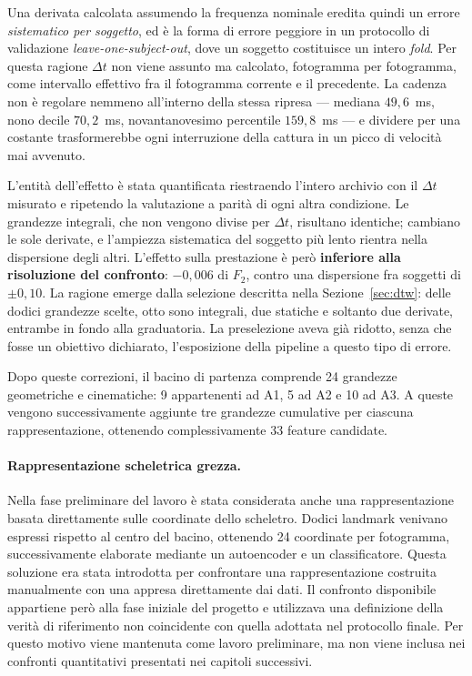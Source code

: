 Una derivata calcolata assumendo la frequenza nominale eredita quindi un errore \emph{sistematico per soggetto}, ed è la forma di errore peggiore in un protocollo di validazione \emph{leave-one-subject-out}, dove un soggetto costituisce un intero \emph{fold}. Per questa ragione $\Delta t$ non viene assunto ma calcolato, fotogramma per fotogramma, come intervallo effettivo fra il fotogramma corrente e il precedente. La cadenza non è regolare nemmeno all'interno della stessa ripresa --- mediana $49{,}6$~ms, nono decile $70{,}2$~ms, novantanovesimo percentile $159{,}8$~ms --- e dividere per una costante trasformerebbe ogni interruzione della cattura in un picco di velocità mai avvenuto.

L'entità dell'effetto è stata quantificata riestraendo l'intero archivio con il $\Delta t$ misurato e ripetendo la valutazione a parità di ogni altra condizione. Le grandezze integrali, che non vengono divise per $\Delta t$, risultano identiche; cambiano le sole derivate, e l'ampiezza sistematica del soggetto più lento rientra nella dispersione degli altri. L'effetto sulla prestazione è però \textbf{inferiore alla risoluzione del confronto}: $-0{,}006$ di $F_2$, contro una dispersione fra soggetti di $\pm 0{,}10$. La ragione emerge dalla selezione descritta nella Sezione~\ref{sec:dtw}: delle dodici grandezze scelte, otto sono integrali, due statiche e soltanto due derivate, entrambe in fondo alla graduatoria. La preselezione aveva già ridotto, senza che fosse un obiettivo dichiarato, l'esposizione della pipeline a questo tipo di errore.

Dopo queste correzioni, il bacino di partenza comprende 24 grandezze geometriche e cinematiche: 9 appartenenti ad A1, 5 ad A2 e 10 ad A3. A queste vengono successivamente aggiunte tre grandezze cumulative per ciascuna rappresentazione, ottenendo complessivamente 33 feature candidate.

\paragraph{Rappresentazione scheletrica grezza.}

Nella fase preliminare del lavoro è stata considerata anche una rappresentazione basata direttamente sulle coordinate dello scheletro. Dodici landmark venivano espressi rispetto al centro del bacino, ottenendo 24 coordinate per fotogramma, successivamente elaborate mediante un autoencoder e un classificatore.
Questa soluzione era stata introdotta per confrontare una rappresentazione costruita manualmente con una appresa direttamente dai dati. Il confronto disponibile appartiene però alla fase iniziale del progetto e utilizzava una definizione della verità di riferimento non coincidente con quella adottata nel protocollo finale. Per questo motivo viene mantenuta come lavoro preliminare, ma non viene inclusa nei confronti quantitativi presentati nei capitoli successivi.


